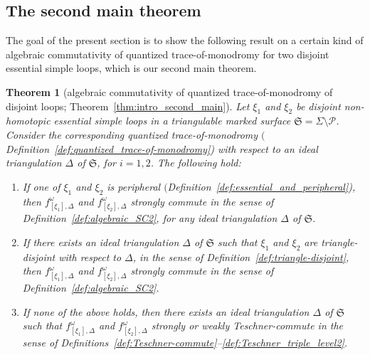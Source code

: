 \documentclass[pdftex]{sigma}
\numberwithin{equation}{section}
\newtheorem{Theorem}{Theorem}[section]
\theoremstyle{definition}
\begin{document}
\subsection{The second main theorem}
The goal of the present section is to show the following result on a certain kind of algebraic commutativity of quantized trace-of-monodromy for two disjoint essential simple loops, which is our second main theorem.
\begin{Theorem}[algebraic commutativity of quantized trace-of-monodromy of disjoint loops; Theorem~\ref{thm:intro_second_main}]
\label{thm:algebraic_commutativity}
Let $\xi_1$ and $\xi_2$ be disjoint non-homotopic essential simple loops in a triangulable marked surface $\mathfrak{S} = \Sigma\setminus \mathcal{P}$. Consider the corresponding quantized trace-of-monodromy  $($Definition~{\rm \ref{def:quantized_trace-of-monodromy})} with respect to an ideal triangulation $\Delta$ of $\mathfrak{S}$, for $i=1,2$. The following hold:
\begin{enumerate}[label={\rm (AC\arabic*)}]\itemsep=-0.1pt\setlength{\leftskip}{0.25cm}
\item\label{AC1} If one of $\xi_1$ and $\xi_2$ is peripheral $($Definition~{\rm \ref{def:essential_and_peripheral})}, then $f^\omega_{[\xi_1],\Delta}$ and $f^\omega_{[\xi_2],\Delta}$ strongly commute in the sense of Definition~{\rm \ref{def:algebraic_SC2}}, for any ideal triangulation $\Delta$ of $\mathfrak{S}$.
\item\label{AC2} If there exists an ideal triangulation $\Delta$ of $\mathfrak{S}$ such that $\xi_1$ and $\xi_2$ are triangle-disjoint with respect to $\Delta$, in the sense of Definition~{\rm \ref{def:triangle-disjoint}}, then $f^\omega_{[\xi_1],\Delta}$ and $f^\omega_{[\xi_2],\Delta}$ strongly commute in the sense of Definition~{\rm \ref{def:algebraic_SC2}}.
\item\label{AC3} If none of the above holds, then there exists an ideal triangulation $\Delta$ of $\mathfrak{S}$ such that $f^\omega_{[\xi_1],\Delta}$ and $f^\omega_{[\xi_2],\Delta}$ strongly or weakly Teschner-commute in the sense of Definitions~{\rm \ref{def:Teschner-commute}--\ref{def:Teschner_triple_level2}}.
\end{enumerate}
\end{Theorem}
\end{document}
